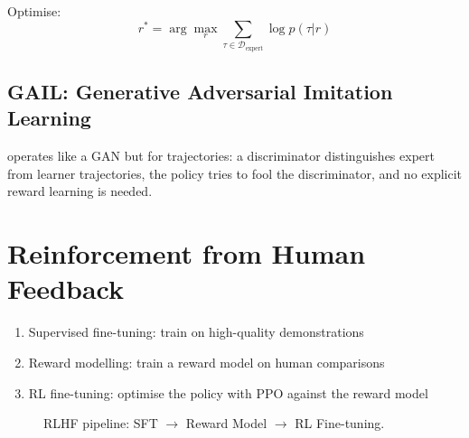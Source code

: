 Optimise:
\begin{equation}
    r^* = \arg\max_r \sum_{\tau \in \mathcal{D}_{\text{expert}}} \log p(\tau | r)
\end{equation}

\subsection{GAIL: Generative Adversarial Imitation Learning}


 operates like a GAN but for trajectories: a discriminator distinguishes expert from learner trajectories, the policy tries to fool the discriminator, and no explicit reward learning is needed.


\section{Reinforcement from Human Feedback}


\begin{enumerate}
    \item Supervised fine-tuning: train on high-quality demonstrations
    \item Reward modelling: train a reward model on human comparisons
    \item RL fine-tuning: optimise the policy with PPO against the reward model
\end{enumerate}

\begin{figure}
\centering
{}
\caption{RLHF pipeline: SFT $\to$ Reward Model $\to$ RL Fine-tuning.}
\label{fig:rlhf_pipeline}
\end{figure}



